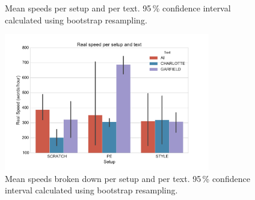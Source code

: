 \begin{figure}[h]
\myfloatalign
{}
\caption{Mean speeds per setup and per text. 95\,\% confidence interval calculated using bootstrap resampling.}
\label{fig:time_real_vs}
\end{figure}

\begin{figure}[h]
\myfloatalign
\includegraphics[width=0.8\textwidth]{img/time/time_real_ts}
\caption{Mean speeds broken down per setup and per text. 95\,\% confidence interval calculated using bootstrap resampling.}
\label{fig:time_real_ts}
\end{figure}

